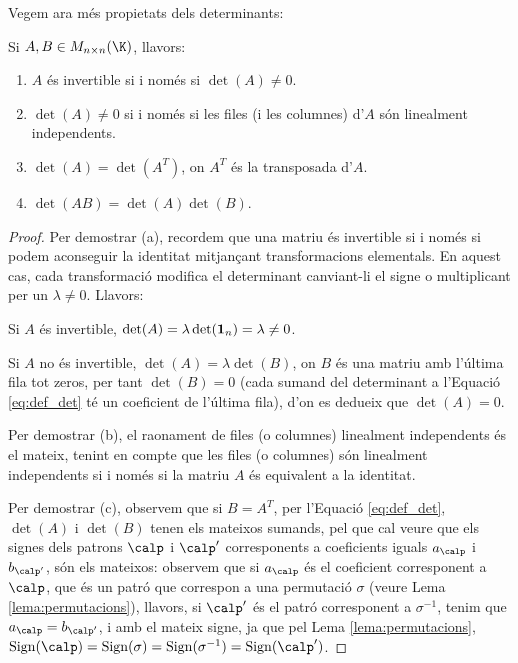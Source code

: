 Vegem ara més propietats dels determinants:
\begin{proposicio}
	Si $A, B\in M_{n\times n}(\K)$, llavors:
	\begin{enumerate}[\rm (a)]
		\item $A$ és invertible si i només si $\det(A)\neq 0$.
		\item $\det(A)\neq 0$ si i només si les files (i les columnes) d'$A$ són linealment independents.
		\item $\det(A)=\det(A^T)$, on $A^T$ és la transposada d'$A$.
		\item $\det(AB)=\det(A)\det(B)$.
	\end{enumerate}
\end{proposicio}
\begin{proof}
    Per demostrar (a), recordem que una matriu és invertible si i només si podem aconseguir la identitat mitjançant transformacions elementals. En aquest cas, cada transformació modifica el determinant canviant-li el signe o multiplicant per un $\lambda\neq 0$. Llavors:
	
	Si $A$ és invertible, $\det(A)=\lambda \det(\mathbf{1}_n)=\lambda \neq 0$.
	
	Si $A$ no és invertible, $\det(A)=\lambda \det(B)$, on $B$ és una matriu amb l'última fila tot zeros, per tant $\det(B)=0$ (cada sumand del determinant a l'Equació \eqref{eq:def_det} té un coeficient de l'última fila), d'on es dedueix que $\det(A)=0$.
	
	Per demostrar (b), el raonament de files (o columnes) linealment independents és el mateix, tenint en compte que les files (o columnes) són linealment independents si i només si la matriu $A$ és equivalent a la identitat.
	
	Per demostrar (c), observem que si $B=A^T$, per l'Equació \eqref{eq:def_det}, $\det(A)$ i $\det(B)$ tenen els mateixos sumands, pel que cal veure que els signes dels patrons $\calp$ i $\calp'$ corresponents a coeficients iguals $a_\calp$ i $b_{\calp'}$, són els mateixos: observem que si $a_\calp$ és el coeficient corresponent a $\calp$, que és un patró que correspon a una permutació $\sigma$ (veure Lema \ref{lema:permutacions}), llavors, si $\calp'$ és el patró corresponent a $\sigma^{-1}$, tenim que $a_\calp=b_{\calp'}$, i amb el mateix signe, ja que pel Lema \ref{lema:permutacions}, $\sign(\calp)=\sign(\sigma)=\sign(\sigma^{-1})=\sign(\calp')$.


\end{proof}
